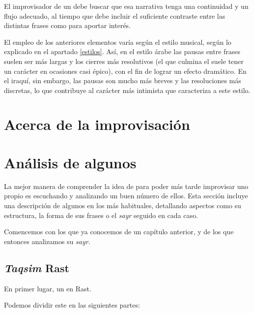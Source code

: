 El improvisador de un \taqsim debe buscar que esa narrativa tenga una continuidad y un flujo adecuado, al tiempo que debe incluir el suficiente contraste entre las distintas frases como para aportar interés.

El empleo de los anteriores elementos varía según el estilo musical, según lo explicado en el apartado \ref{estilos}. Así, en el estilo árabe las pausas entre frases suelen ser más largas y los cierres más resolutivos (el que culmina el \taqsim suele tener un carácter en ocasiones casi épico), con el fin de lograr un efecto dramático. En el iraquí, sin embargo, las pausas son mucho más breves y las resoluciones más discretas, lo que contribuye al carácter más intimista que caracteriza a este estilo.

\section{Acerca de la improvisación}



\section{Análisis de algunos \taqsimb}

La mejor manera de comprender la idea de \taqsim para poder más tarde improvisar uno propio es escuchando y analizando un buen número de ellos. Esta sección incluye una descripción de algunos \taqasim en los \maqamaat más habituales, detallando aspectos como su estructura, la forma de sus frases o el \emph{sayr} seguido en cada caso.

Comencemos con los \taqasim que ya conocemos de un capítulo anterior, y de los que entonces analizamos su \emph{sayr}.

\subsection{\emph{Taqsim} Rast}

En primer lugar, un \taqsim en \maqam Rast.


Podemos dividir este \taqsim en las siguientes partes:

